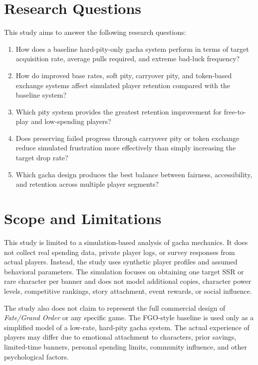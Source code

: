 \documentclass[sigconf,nonacm]{acmart}
\begin{document}
\section{Research Questions}

This study aims to answer the following research questions:

\begin{enumerate}[label=\textbf{RQ\arabic*.}]
    \item How does a baseline hard-pity-only gacha system perform in terms of target acquisition rate, average pulls required, and extreme bad-luck frequency?
    \item How do improved base rates, soft pity, carryover pity, and token-based exchange systems affect simulated player retention compared with the baseline system?
    \item Which pity system provides the greatest retention improvement for free-to-play and low-spending players?
    \item Does preserving failed progress through carryover pity or token exchange reduce simulated frustration more effectively than simply increasing the target drop rate?
    \item Which gacha design produces the best balance between fairness, accessibility, and retention across multiple player segments?
\end{enumerate}

\section{Scope and Limitations}

This study is limited to a simulation-based analysis of gacha mechanics. It does not collect real spending data, private player logs, or survey responses from actual players. Instead, the study uses synthetic player profiles and assumed behavioral parameters. The simulation focuses on obtaining one target SSR or rare character per banner and does not model additional copies, character power levels, competitive rankings, story attachment, event rewards, or social influence.

The study also does not claim to represent the full commercial design of \textit{Fate/Grand Order} or any specific game. The FGO-style baseline is used only as a simplified model of a low-rate, hard-pity gacha system. The actual experience of players may differ due to emotional attachment to characters, prior savings, limited-time banners, personal spending limits, community influence, and other psychological factors.
\end{document}
